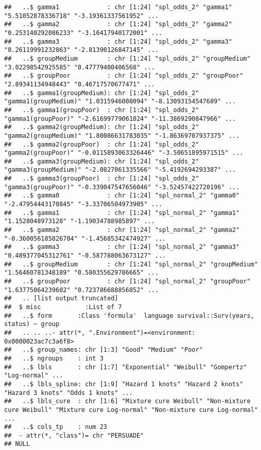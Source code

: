 \documentclass[
]{article}
\begin{document}
\begin{verbatim}
##   ..$ gamma1             : chr [1:24] "spl_odds_2" "gamma1" "5.51052878336718" "-3.19361337561952" ...
##   ..$ gamma2             : chr [1:24] "spl_odds_2" "gamma2" "0.253140292086233" "-3.16417940172001" ...
##   ..$ gamma3             : chr [1:24] "spl_odds_2" "gamma3" "0.26119991232863" "-2.81390126847145" ...
##   ..$ groupMedium        : chr [1:24] "spl_odds_2" "groupMedium" "3.02298542925585" "0.47779400406568" ...
##   ..$ groupPoor          : chr [1:24] "spl_odds_2" "groupPoor" "2.89341134948443" "0.46717570677471" ...
##   ..$ gamma1(groupMedium): chr [1:24] "spl_odds_2" "gamma1(groupMedium)" "1.0315946008094" "-8.13093154547689" ...
##   ..$ gamma1(groupPoor)  : chr [1:24] "spl_odds_2" "gamma1(groupPoor)" "-2.61699779061024" "-11.3869290847966" ...
##   ..$ gamma2(groupMedium): chr [1:24] "spl_odds_2" "gamma2(groupMedium)" "1.80086631783035" "-1.86369707937375" ...
##   ..$ gamma2(groupPoor)  : chr [1:24] "spl_odds_2" "gamma2(groupPoor)" "-0.0115893063326446" "-3.50651895971515" ...
##   ..$ gamma3(groupMedium): chr [1:24] "spl_odds_2" "gamma3(groupMedium)" "-2.0827061335566" "-5.4192694293387" ...
##   ..$ gamma3(groupPoor)  : chr [1:24] "spl_odds_2" "gamma3(groupPoor)" "-0.339047547656046" "-3.52457422720196" ...
##   ..$ gamma0             : chr [1:24] "spl_normal_2" "gamma0" "-2.47954443170845" "-3.33706504973905" ...
##   ..$ gamma1             : chr [1:24] "spl_normal_2" "gamma1" "1.1528048973128" "-1.19034788985897" ...
##   ..$ gamma2             : chr [1:24] "spl_normal_2" "gamma2" "-0.360056185826704" "-1.45685342474927" ...
##   ..$ gamma3             : chr [1:24] "spl_normal_2" "gamma3" "0.489377045312761" "-0.587788063673127" ...
##   ..$ groupMedium        : chr [1:24] "spl_normal_2" "groupMedium" "1.56460781348189" "0.580355629786665" ...
##   ..$ groupPoor          : chr [1:24] "spl_normal_2" "groupPoor" "1.63775064239602" "0.723786688856852" ...
##   .. [list output truncated]
##  $ misc            :List of 7
##   ..$ form       :Class 'formula'  language survival::Surv(years, status) ~ group
##   .. .. ..- attr(*, ".Environment")=<environment: 0x0000023ac7c3a6f8> 
##   ..$ group_names: chr [1:3] "Good" "Medium" "Poor"
##   ..$ ngroups    : int 3
##   ..$ lbls       : chr [1:7] "Exponential" "Weibull" "Gompertz" "Log-normal" ...
##   ..$ lbls_spline: chr [1:9] "Hazard 1 knots" "Hazard 2 knots" "Hazard 3 knots" "Odds 1 knots" ...
##   ..$ lbls_cure  : chr [1:6] "Mixture cure Weibull" "Non-mixture cure Weibull" "Mixture cure Log-normal" "Non-mixture cure Log-normal" ...
##   ..$ cols_tp    : num 23
##  - attr(*, "class")= chr "PERSUADE"
## NULL
\end{verbatim}
\end{document}
